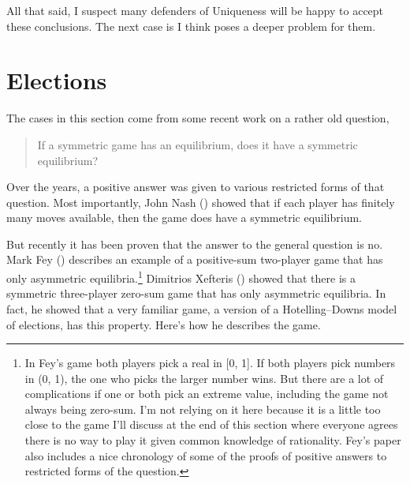 \documentclass[
  11pt,
  letterpaper,
  DIV=11,
  numbers=noendperiod,
  twoside]{scrartcl}
\begin{document}
All that said, I suspect many defenders of Uniqueness will be happy to
accept these conclusions. The next case is I think poses a deeper
problem for them.

\section{Elections}\label{elections}

The cases in this section come from some recent work on a rather old
question,

\begin{quote}
If a symmetric game has an equilibrium, does it have a symmetric
equilibrium?
\end{quote}

Over the years, a positive answer was given to various restricted forms
of that question. Most importantly, John Nash
() showed that if each player has finitely
many moves available, then the game does have a symmetric equilibrium.

But recently it has been proven that the answer to the general question
is no. Mark Fey () describes an example of a
positive-sum two-player game that has only asymmetric
equilibria.\footnote{In Fey's game both players pick a real in {[}0,
  1{]}. If both players pick numbers in (0, 1), the one who picks the
  larger number wins. But there are a lot of complications if one or
  both pick an extreme value, including the game not always being
  zero-sum. I'm not relying on it here because it is a little too close
  to the game I'll discuss at the end of this section where everyone
  agrees there is no way to play it given common knowledge of
  rationality. Fey's paper also includes a nice chronology of some of
  the proofs of positive answers to restricted forms of the question.}
Dimitrios Xefteris () showed that there
is a symmetric three-player zero-sum game that has only asymmetric
equilibria. In fact, he showed that a very familiar game, a version of a
Hotelling--Downs model of elections, has this property. Here's how he
describes the game.
\end{document}
